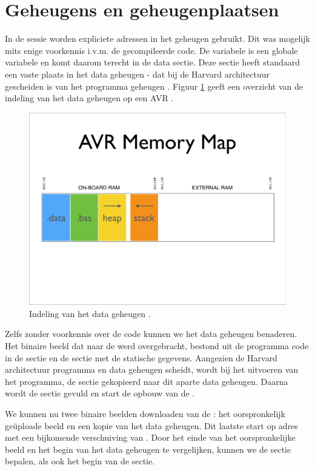 \section{Geheugens en geheugenplaatsen}

In de  sessie worden expliciete adressen in het geheugen gebruikt. Dit
was mogelijk mits enige voorkennis i.v.m. de gecompileerde code. De
 variabele is een globale variabele en komt daarom terecht in de
 data sectie. Deze sectie heeft standaard een vaste plaats in het
data geheugen - dat bij de Harvard architectuur gescheiden is van het programma
geheugen \citep{avr-memory}. Figuur \ref{fig:avr-ram-map} geeft een overzicht
van de indeling van het data geheugen op een AVR \mcu.

\begin{figure}[ht]
  \centering
  \includegraphics[width=0.9\linewidth]{resources/avr-ram-map.pdf}
  \caption{Indeling van het data geheugen \citep{avr-malloc}.}
  \label{fig:avr-ram-map}
\end{figure}

Zelfs zonder voorkennis over de code kunnen we het data geheugen benaderen. Het
binaire beeld dat naar de \mcu werd overgebracht, bestond uit de programma code
in de  sectie en de  sectie met de statische gegevens.
Aangezien de Harvard architectuur programma en data geheugen scheidt, wordt bij
het uitvoeren van het programma, de  sectie gekopieerd naar dit
aparte data geheugen. Daarna wordt de  sectie gevuld en start de
opbouw van de .

We kunnen nu twee binaire beelden downloaden van de \mcu: het oorspronkelijk
ge\"uploade beeld en een kopie van het data geheugen. Dit laatste start op
adres  met een bijkomende verschuiving van . Door het
einde van het oorspronkelijke beeld en het begin van het data geheugen te
vergelijken, kunnen we de  sectie bepalen, als ook het begin van de
 sectie.

